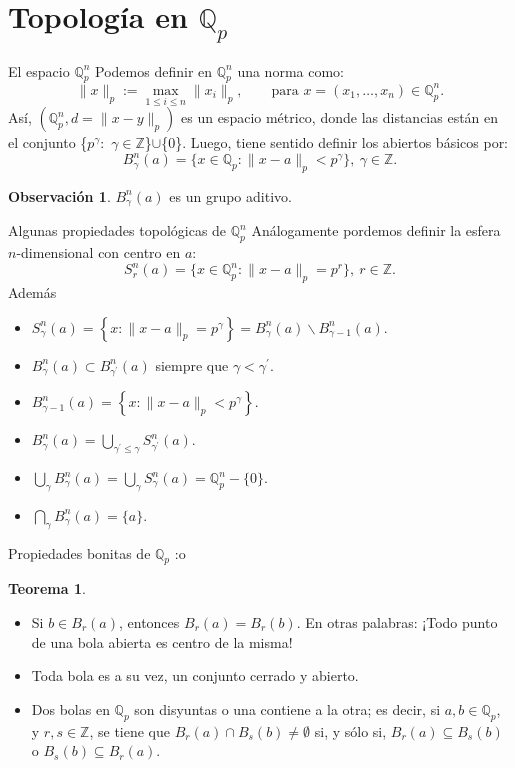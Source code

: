\documentclass{beamer}
\newcommand{\bb}[1]{\mathbb{#1}}
\theoremstyle{definition}
\numberwithin{equation}{section}
\newcommand{\orangee}[1]{\textcolor{thColor}{#1}}
\newcommand{\redd}[1]{\textcolor{rkColor}{#1}}
\newtheorem{thh}{\orangee{Teorema}}
\newtheorem{rr}{\redd{Observación}}
\renewcommand{\leq}{\leqslant}
\newcommand{\Z}{\mathbb{Z}}
\newcommand{\Qp}{\mathbb{Q}_p}
\newcommand{\Qpn}{\mathbb{Q}_p^n}
\newcommand{\pnorm}[1]{\|#1\|_p}
\begin{document}
\section{Topología en $\Qp$}
\begin{frame}{El espacio $\Qpn$}
	Podemos definir en $\Qpn$ una norma como:\[
	\pnorm{x}:=\max_{1\leq i\leq n}\pnorm{x_i},\qquad\text{para }x= (x_{1},\dots,x_{n})\in\Qpn.
	\]
	Así, $(\Qpn, d=\pnorm{x-y})$ es un espacio métrico, donde las distancias están en el conjunto \{$p^\gamma$$\colon$ $\gamma\in\Z$\}$\cup$\{$0$\}. Luego, tiene sentido definir los abiertos básicos por:
	 \[
	 B^n_{\gamma} (a)=\{x\in\Qp:\pnorm{x-a}< p^{\gamma}\},\ \gamma\in \mathbb{Z}.
	 \]
	 \begin{rr}
	 	$B_\gamma^n (a)$ es un grupo aditivo.
	 \end{rr}
\end{frame}
\begin{frame}{Algunas propiedades topológicas de $\Qpn$}
	Análogamente pordemos definir la esfera $n$-dimensional con centro en $a$:
	\[
	S^n_{r} (a)=\{x\in\Qpn:\pnorm{x-a}=p^{r}\},\ r\in \mathbb{Z}.
	\]
	Además
	\begin{itemize}[<+- | alert@+>]
		\item $S_{\gamma}^n (a)=\left\{x:\pnorm{x-a}=p^{\gamma}\right\}=B_{\gamma}^n (a) \backslash B_{\gamma-1}^n (a).$
		\item${B_{\gamma}^n (a) \subset B_{\gamma^{\prime}}^n (a)}$ siempre que $\gamma<\gamma^{\prime}.$
		\item $B_{\gamma-1}^n (a)=\left\{x:\pnorm{x-a}<p^{\gamma}\right\}.$ 
		\item $B_{\gamma}^n (a)=\bigcup_{\gamma^{\prime} \leq \gamma} S_{\gamma^{\prime}}^n (a).$
		\item $\bigcup_{\gamma} B_{\gamma}^n (a)=\bigcup_{\gamma} S_{\gamma}^n (a)=\mathbb{Q}_{p}^n-\{0\}.$
		\item $\bigcap_{\gamma} B_{\gamma}^n (a)=\{a\}.$
	\end{itemize}
\end{frame}
\begin{frame}{Propiedades bonitas de $\Qp$ :o}
	\begin{thh}
	\begin{itemize}[<+- | alert@+>]
		\item \label{clopen1} Si $b\in B_{r} (a)$, entonces $B_{r} (a)=B_{r} (b)$. En otras palabras: ¡Todo  punto de una bola abierta es centro de la misma!
		\item Toda bola es a su vez, un conjunto cerrado y abierto.
		\item Dos bolas en $\Qp$ son disyuntas o una contiene a la otra; es decir, si $a,b \in \bb{Q}_p$, y $r,s\in \Z$, se tiene que $B_{r} (a)\cap B_{s} (b)\neq\emptyset$ si, y sólo si, $B_{r} (a)\subseteq B_{s} (b)$ o $B_{s} (b)\subseteq B_{r} (a)$.
	\end{itemize}	
	\end{thh}
	
	
\end{frame}
\end{document}
